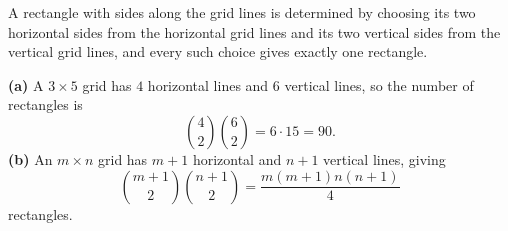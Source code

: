 A rectangle with sides along the grid lines is determined by choosing its two horizontal sides from the horizontal grid lines and its two vertical sides from the vertical grid lines, and every such choice gives exactly one rectangle.

\textbf{(a)} A $3\times5$ grid has $4$ horizontal lines and $6$ vertical lines, so the number of rectangles is
\[
\binom42\binom62=6\cdot15=\boxed{90}.
\]
\textbf{(b)} An $m\times n$ grid has $m+1$ horizontal and $n+1$ vertical lines, giving
\[
\boxed{\binom{m+1}2\binom{n+1}2=\dfrac{m(m+1)n(n+1)}{4}}
\]
rectangles.
